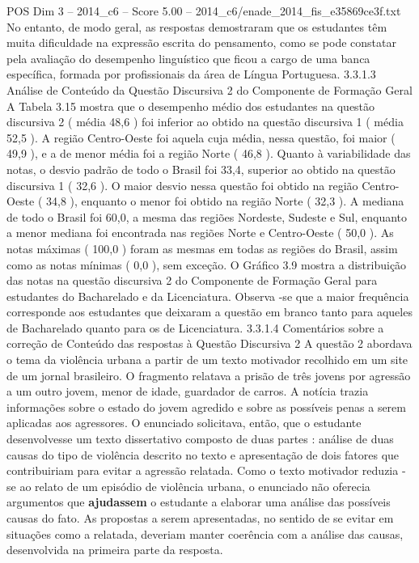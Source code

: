 \begin{textsample}{POS Dim 3 – 2014\_c6 – Score 5.00 – 2014\_c6/enade\_2014\_fis\_e35869ce3f.txt}
No entanto, de modo geral, as respostas demostraram que os estudantes têm muita dificuldade na expressão escrita do pensamento, como se pode constatar pela avaliação do desempenho linguístico que ficou a cargo de uma banca específica, formada por profissionais da área de Língua Portuguesa. 3.3.1.3 Análise de Conteúdo da Questão Discursiva 2 do Componente de Formação Geral A Tabela 3.15 mostra que o desempenho médio dos estudantes na questão discursiva 2 ( média 48,6 ) foi inferior ao obtido na questão discursiva 1 ( média 52,5 ).
A região Centro-Oeste foi aquela cuja média, nessa questão, foi maior ( 49,9 ), e a de menor média foi a região Norte ( 46,8 ).
Quanto à variabilidade das notas, o desvio padrão de todo o Brasil foi 33,4, superior ao obtido na questão discursiva 1 ( 32,6 ).
O maior desvio nessa questão foi obtido na região Centro-Oeste ( 34,8 ), enquanto o menor foi obtido na região Norte ( 32,3 ).
A mediana de todo o Brasil foi 60,0, a mesma das regiões Nordeste, Sudeste e Sul, enquanto a menor mediana foi encontrada nas regiões Norte e Centro-Oeste ( 50,0 ).
As notas máximas ( 100,0 ) foram as mesmas em todas as regiões do Brasil, assim como as notas mínimas ( 0,0 ), sem exceção.
O Gráfico 3.9 mostra a distribuição das notas na questão discursiva 2 do Componente de Formação Geral para estudantes do Bacharelado e da Licenciatura.
Observa -se que a maior frequência corresponde aos estudantes que deixaram a questão em branco tanto para aqueles de Bacharelado quanto para os de Licenciatura. 3.3.1.4 Comentários sobre a correção de Conteúdo das respostas à Questão Discursiva 2 A questão 2 abordava o tema da violência urbana a partir de um texto motivador recolhido em um site de um jornal brasileiro.
O fragmento relatava a prisão de três jovens por agressão a um outro jovem, menor de idade, guardador de carros.
A notícia trazia informações sobre o estado do jovem agredido e sobre as possíveis penas a serem aplicadas aos agressores.
O enunciado solicitava, então, que o estudante desenvolvesse um texto dissertativo composto de duas partes : análise de duas causas do tipo de violência descrito no texto e apresentação de dois fatores que contribuiriam para evitar a agressão relatada.
Como o texto motivador reduzia -se ao relato de um episódio de violência urbana, o enunciado não oferecia argumentos que \textbf{ajudassem} o estudante a elaborar uma análise das possíveis causas do fato.
As propostas a serem apresentadas, no sentido de se evitar em situações como a relatada, deveriam manter coerência com a análise das causas, desenvolvida na primeira parte da resposta.

\end{textsample}
